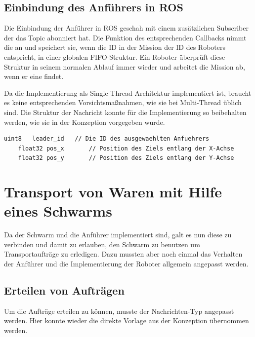 \subsection*{Einbindung des Anführers in ROS}

Die Einbindung der Anführer in ROS geschah mit einem zusätzlichen Subscriber der das Topic  abonniert hat. Die Funktion des entsprechenden Callbacks nimmt die  an und speichert sie, wenn die ID in der Mission der ID des Roboters entspricht, in einer globalen FIFO-Struktur. Ein Roboter überprüft diese Struktur in seinem normalen Ablauf immer wieder und arbeitet die Mission ab, wenn er eine findet.

Da die Implementierung als Single-Thread-Architektur implementiert ist, braucht es keine entsprechenden Vorsichtsmaßnahmen, wie sie bei Multi-Thread üblich sind.
Die Struktur der Nachricht konnte für die Implementierung so beibehalten werden, wie sie in der Konzeption vorgegeben wurde.

\begin{lstlisting}[style=ros, title=Nachrichten-Typ: New\_Mission]
	uint8	leader_id	// Die ID des ausgewaehlten Anfuehrers
	float32 pos_x		// Position des Ziels entlang der X-Achse
	float32 pos_y		// Position des Ziels entlang der Y-Achse
\end{lstlisting}









\section{Transport von Waren mit Hilfe eines Schwarms}

Da der Schwarm und die Anführer implementiert sind, galt es nun diese zu verbinden und damit zu erlauben, den Schwarm zu benutzen um Transportaufträge zu erledigen. Dazu mussten aber noch einmal das Verhalten der Anführer und die Implementierung der Roboter allgemein angepasst werden.

\subsection*{Erteilen von Aufträgen}

Um die Aufträge erteilen zu können, musste der Nachrichten-Typ angepasst werden. Hier konnte wieder die direkte Vorlage aus der Konzeption übernommen werden.

